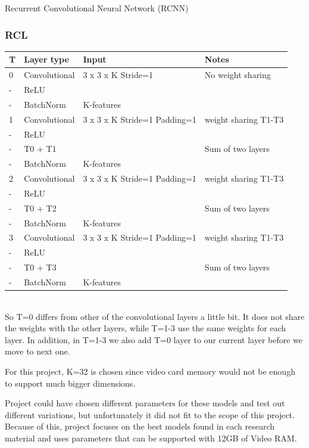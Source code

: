 \documentclass[article,11pt]{article}
\begin{document}
\begin{definition}{{\small Recurrent Convolutional Neural Network (RCNN)}}{}
    \subsubsection{RCL}
    \begin{tabular}{| l | l | l | l |}
        \hline
        \bf T & \bf Layer type & \bf Input &\bf Notes \\
        \hline			
        0 & Convolutional & 3 x 3 x K Stride=1& No weight sharing\\
        - & ReLU & &\\
        - & BatchNorm & K-features & \\
        \hline
        \hline
        1 & Convolutional & 3 x 3 x K Stride=1 Padding=1 & weight sharing T1-T3\\
        - & ReLU & &\\
        - & T0 + T1 & & Sum of two layers\\
        - & BatchNorm & K-features &\\

        2 & Convolutional & 3 x 3 x K Stride=1 Padding=1 & weight sharing T1-T3\\
        - & ReLU & & \\
        - & T0 + T2 & & Sum of two layers\\
        - & BatchNorm & K-features & \\

        3 & Convolutional & 3 x 3 x K Stride=1 Padding=1 & weight sharing T1-T3 \\
        - & ReLU & & \\
        - & T0 + T3 & & Sum of two layers \\
        - & BatchNorm & K-features & \\
        \hline  
    \end{tabular}\\

    So T=0 differs from other of the convolutional layers a little bit. It does not share the weights with the other layers, while
    T=1-3 use the same weights for each layer. In addition, in T=1-3 we also add T=0 layer to our current layer before we move to next one.
    
    For this project, K=32 is chosen since video card memory would not be enough to support much bigger dimensions.
\end{definition}

Project could have chosen different parameters for these models and test out different variations, but unfortunately
it did not fit to the scope of this project. Because of this, project focuses on the best models found in each research material and uses
parameters that can be supported with 12GB of Video RAM.
\end{document}
